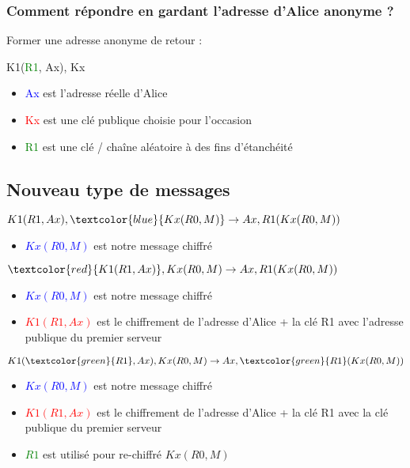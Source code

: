 \documentclass{beamer}
\begin{document}
\begin{frame}
\frametitle{Comment répondre en gardant l'adresse d'Alice anonyme ?}
Former une adresse anonyme de retour :
\begin{center}
K1(\textcolor{green}{R1}, Ax), Kx
\end{center}
\begin{itemize}
[triangle]
\item \textcolor{blue}{Ax} est l'adresse réelle d'Alice
\item \textcolor{red}{Kx} est une clé publique choisie pour l'occasion
\item \textcolor{green}{R1} est une clé / chaîne aléatoire à des fins d'étanchéité
\end{itemize}
\end{frame}

\subsection{Nouveau type de messages}
\begin{frame}
\begin{center}
$K1( R1, Ax ), \textcolor{blue}{Kx( R0, M )} \rightarrow Ax, R1( Kx( R0, M ))$
\end{center}
\begin{itemize}
[triangle]
\item \textcolor{blue}{$Kx( R0, M )$} est notre message chiffré
\end{itemize}
\end{frame}

\begin{frame}
\begin{center}
$\textcolor{red}{K1( R1, Ax )}, Kx( R0, M ) \rightarrow Ax, R1( Kx( R0, M ))$
\end{center}
\begin{itemize}
[triangle]
\item \textcolor{blue}{$Kx( R0, M )$} est notre message chiffré
\item \textcolor{red}{$K1( R1, Ax )$} est le chiffrement de l'adresse d'Alice + la clé R1 avec l'adresse publique du premier serveur
\end{itemize}
\end{frame}

\begin{frame}
\begin{center}
$K1( \textcolor{green}{R1}, Ax ), Kx( R0, M ) \rightarrow Ax, \textcolor{green}{R1}( Kx( R0, M ))$
\end{center}
\begin{itemize}
[triangle]
\item \textcolor{blue}{$Kx( R0, M )$} est notre message chiffré
\item \textcolor{red}{$K1( R1, Ax )$} est le chiffrement de l'adresse d'Alice + la clé R1
 avec la clé publique du premier serveur
\item \textcolor{green}{$R1$} est utilisé pour re-chiffré $Kx( R0, M )$
\end{itemize}
\end{frame}
\end{document}
